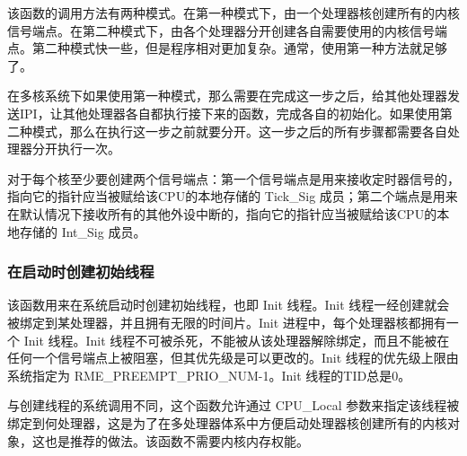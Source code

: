 该函数的调用方法有两种模式。在第一种模式下，由一个处理器核创建所有的内核信号端点。在第二种模式下，由各个处理器分开创建各自需要使用的内核信号端点。第二种模式快一些，但是程序相对更加复杂。通常，使用第一种方法就足够了。

在多核系统下如果使用第一种模式，那么需要在完成这一步之后，给其他处理器发送IPI，让其他处理器各自都执行接下来的函数，完成各自的初始化。如果使用第二种模式，那么在执行这一步之前就要分开。这一步之后的所有步骤都需要各自处理器分开执行一次。

对于每个核至少要创建两个信号端点：第一个信号端点是用来接收定时器信号的，指向它的指针应当被赋给该CPU的本地存储的 Tick\_Sig 成员；第二个端点是用来在默认情况下接收所有的其他外设中断的，指向它的指针应当被赋给该CPU的本地存储的 Int\_Sig 成员。

\subsubsection{在启动时创建初始线程}\label{subsubsec:7-create-initial-thread-at-boot}

该函数用来在系统启动时创建初始线程，也即 Init 线程。Init 线程一经创建就会被绑定到某处理器，并且拥有无限的时间片。Init 进程中，每个处理器核都拥有一个 Init 线程。Init 线程不可被杀死，不能被从该处理器解除绑定，而且不能被在任何一个信号端点上被阻塞，但其优先级是可以更改的。Init 线程的优先级上限由系统指定为 RME\_PREEMPT\_PRIO\_NUM-1。Init 线程的TID总是0。

与创建线程的系统调用不同，这个函数允许通过 CPU\_Local 参数来指定该线程被绑定到何处理器，这是为了在多处理器体系中方便启动处理器核创建所有的内核对象，这也是推荐的做法。该函数不需要内核内存权能。

